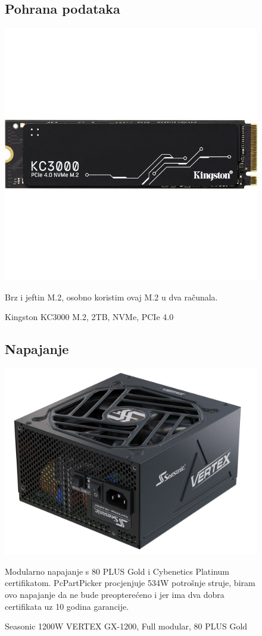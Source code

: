 \documentclass{article}
\begin{document}
\begin{figure}[H]
\subsection{Pohrana podataka}
\centering
\includegraphics[scale=0.2]{Slike/098700228_55873-2678.jpg}
\caption{Kingston KC3000 M.2, 2TB, NVMe, PCIe 4.0}
Brz i jeftin M.2, osobno koristim ovaj M.2 u dva računala.
\end{figure}

\begin{figure}[H]
\subsection{Napajanje}
\centering
\includegraphics[scale=0.1]{Slike/ver.png}
\caption{Seasonic 1200W VERTEX GX-1200, Full modular, 80 PLUS Gold}
Modularno napajanje s 80 PLUS Gold i Cybenetics Platinum certifikatom. PcPartPicker procjenjuje 534W potrošnje struje, biram ovo napajanje da ne bude preopterećeno i jer ima dva dobra certifikata uz 10 godina garancije.
\end{figure}
\end{document}
